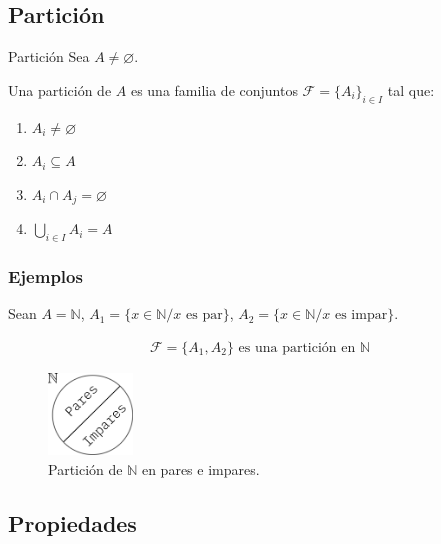 \subsection{Partición}

\begin{definicion}{Partición}{}
    Sea $A \neq \varnothing$. 

    \medskip
    
    Una partición de $A$ es una familia de conjuntos
    $\mathcal{F} = \{ A_i \}_{i \in I}$ tal que:
    
    \begin{enumerate}
        \item $A_i \neq \varnothing$ 
        \item $A_i \subseteq A$ 
        \item $A_i \cap A_j = \varnothing$ 
        \item $\bigcup_{i \in I} A_i = A$
    \end{enumerate}
\end{definicion}

\subsubsection{Ejemplos}

Sean $A = \mathbb{N}$, $A_1 = \{ x \in \mathbb{N} / x \text{ es par} \}$,
$A_2 = \{ x \in \mathbb{N} / x \text{ es impar} \}$.

\begin{gather*}
    \mathcal{F} = \{ A_1, A_2 \} \text{ es una partición en } \mathbb{N} 
\end{gather*}


\begin{figure}[H]
    \centering
    \includegraphics[width=0.20\textwidth]{particion_n_pares_impares}
    \caption{Partición de $\mathbb{N}$ en pares e impares.}
\end{figure}

\subsection{Propiedades}

